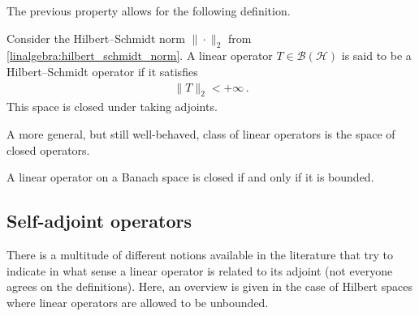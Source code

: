     The previous property allows for the following definition.

    \begin{example}\label{functional:hilbert_schmidt}
        Consider the Hilbert--Schmidt norm $\|\cdot\|_2$ from \cref{linalgebra:hilbert_schmidt_norm}. A linear operator $T\in\mathcal{B}(\mathcal{H})$ is said to be a Hilbert--Schmidt operator if it satisfies
        \begin{gather}
            \|T\|_2<+\infty\,.
        \end{gather}
        This space is closed under taking adjoints.
    \end{example}

    A more general, but still well-behaved, class of linear operators is the space of closed operators.

    \begin{theorem}
        A linear operator on a Banach space is closed if and only if it is bounded.
    \end{theorem}

\subsection{Self-adjoint operators}

    There is a multitude of different notions available in the literature that try to indicate in what sense a linear operator is related to its adjoint (not everyone agrees on the definitions). Here, an overview is given in the case of Hilbert spaces where linear operators are allowed to be unbounded.

